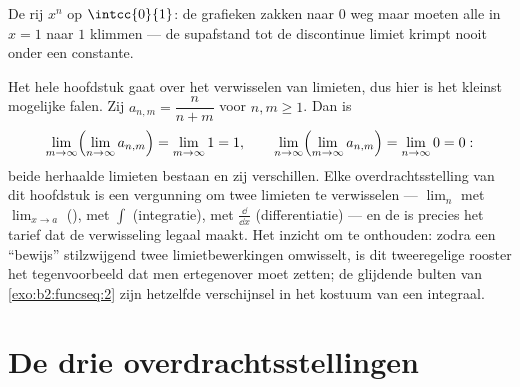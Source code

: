 \begin{omfigure}

{\small De rij $x^n$ op $\intcc{0}{1}$: de grafieken zakken naar $0$
weg maar moeten alle in $x = 1$ naar $1$ klimmen --- de supafstand
tot de discontinue  limiet krimpt nooit onder een
constante.}
\end{omfigure}

\begin{example}\label{ex:b2:funcseq:doublelimit}
Het hele hoofdstuk gaat over het verwisselen van limieten, dus hier
is het kleinst mogelijke falen. Zij $a_{n,m} = \dfrac{n}{n+m}$ voor
$n, m \geq 1$. Dan is
\[
\lim_{m\to\infty}\Bigl(\lim_{n\to\infty}a_{n,m}\Bigr)
= \lim_{m\to\infty} 1 = 1,
\qquad
\lim_{n\to\infty}\Bigl(\lim_{m\to\infty}a_{n,m}\Bigr)
= \lim_{n\to\infty} 0 = 0 :
\]
beide herhaalde limieten bestaan en zij verschillen. Elke
overdrachtsstelling van dit hoofdstuk is een vergunning om twee
limieten te verwisselen --- $\lim_n$ met $\lim_{x\to a}$
(), met $\int$ (integratie), met $\frac{\dd}{\dd x}$
(differentiatie) --- en de  is precies het
tarief dat de verwisseling legaal maakt. Het inzicht om te
onthouden: zodra een ``bewijs'' stilzwijgend twee limietbewerkingen
omwisselt, is dit tweeregelige rooster het tegenvoorbeeld dat men
ertegenover moet zetten; de glijdende bulten van
\cref{exo:b2:funcseq:2} zijn hetzelfde verschijnsel in het kostuum
van een integraal.
\end{example}

\section{De drie overdrachtsstellingen}

